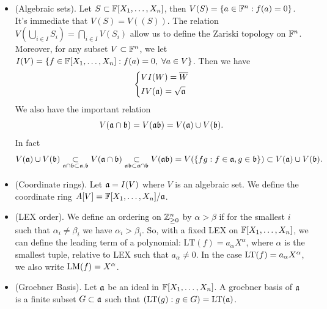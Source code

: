 \begin{itemize}
    \begin{remark}
        A ring is said to be noetherian if it satisfy the ascending chain condition, or equivalently, 
         if all of its ideals are finitely generated.
    \end{remark}
    \item(Algebraic sets). Let $S \subset \mathbb{F}[X_1,\dots, X_n]$, then $V(S) = \{a\in\mathbb{F}^n: f(a)=0\}$. It's 
    immediate that $V(S) = V((S))$. The relation $V(\bigcup_{i\in I}S_i)=\bigcap_{i\in I}V(S_i)$ allow us 
    to define the Zariski topology on $\mathbb{F}^n$. 
    Moreover, for any subset $V\subset \mathbb{F}^n$, we let 
    $I(V)=\{f\in\mathbb{F}[X_1,\dots,X_n]: f(a)=0,\;\forall a\in V\}$. Then we have 
    \begin{equation}
       \left\{ \begin{aligned}
            &VI(W) = \overline{W}\\
            &IV(\mathfrak{a}) = \sqrt{\mathfrak{a}}
        \end{aligned}\right.
    \end{equation}
    We also have the important relation
    \begin{equation}
        V(\mathfrak{a}\cap\mathfrak{b}) = V(\mathfrak{a}\mathfrak{b}) = V(\mathfrak{a})\cup V(\mathfrak{b}).
    \end{equation}
    In fact 
    \begin{equation}
        V(\mathfrak{a})\cup V(\mathfrak{b})\underset{\mathfrak{a}\cap\mathfrak{b}\subset \mathfrak{a},\mathfrak{b}}{\subset}
        V(\mathfrak{a}\cap\mathfrak{b})\underset{\mathfrak{a}\mathfrak{b}\subset\mathfrak{a}\cap\mathfrak{b}}{\subset}V(\mathfrak{a}\mathfrak{b})
        =V(\{fg:f\in\mathfrak{a},g\in\mathfrak{b}\})\subset V(\mathfrak{a})\cup V(\mathfrak{b}).
    \end{equation}

    \item(Coordinate rings). Let $\mathfrak{a} = I(V)$ where $V$ is an algebraic set. We define the coordinate ring 
    $A[V] = \mathbb{F}[X_1,\dots, X_n]/\mathfrak{a}$.

    \item(LEX order). We define an ordering on $\mathbb{Z}_{\geq0}^n$ by $\alpha > \beta$ if 
    for the smallest $i$ such that $\alpha_i\neq \beta_i$ we have $\alpha_i > \beta_i$. So, with a 
    fixed LEX on $\mathbb{F}[X_1,\dots, X_n]$, we can define the leading term of a polynomial: 
    $\text{LT}(f) = a_\alpha X^\alpha$, where $\alpha$ is the smallest tuple, relative to LEX such that 
    $a_\alpha\neq0$. In the case $\text{LT}(f) = a_\alpha X^\alpha$, we also write $\text{LM}(f) =X^\alpha$.

    \item(Groebner Basis). Let $\mathfrak{a}$ be an ideal in $\mathbb{F}[X_1,\dots, X_n]$. A groebner basis of $\mathfrak{a}$ 
    is a finite subset $G\subset\mathfrak{a}$ such that $(\text{LT}(g):g\in G) = \text{LT}(\mathfrak{a})$.\par 
    

\end{itemize}
